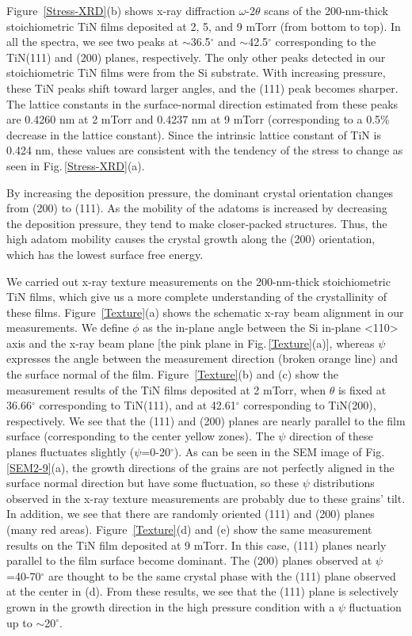 Figure \,\ref{Stress-XRD}(b) shows x-ray diffraction $\omega$-2$\theta$ scans of the 200-nm-thick stoichiometric TiN films deposited at 2, 5, and 9 mTorr (from bottom to top). In all the spectra, we see two peaks at $\sim$36.5$^{\circ}$ and $\sim$42.5$^{\circ}$ corresponding to the TiN(111) and (200) planes, respectively. The only other peaks detected in our stoichiometric TiN films were from the Si substrate.  With increasing pressure, these TiN peaks shift toward larger angles, and the (111) peak becomes sharper. The lattice constants in the surface-normal direction estimated from these peaks are 0.4260 nm at 2 mTorr and 0.4237 nm at 9 mTorr (corresponding to a 0.5\% decrease in the lattice constant). Since the intrinsic lattice constant of TiN is 0.424 nm, these values are consistent with the tendency of the stress to change as seen in Fig.\,\ref{Stress-XRD}(a).

By increasing the deposition pressure, the dominant crystal orientation changes from (200) to (111). As the mobility of the adatoms is increased by decreasing the deposition pressure, they tend to make closer-packed structures. Thus, the high adatom mobility causes the crystal growth along the (200) orientation, which has the lowest surface free energy.\cite{Patsalas2000}

We carried out x-ray texture measurements on the 200-nm-thick stoichiometric TiN films, which give us a more complete understanding of the crystallinity of these films. Figure \,\ref{Texture}(a) shows the schematic x-ray beam alignment in our measurements. We define $\phi$ as the in-plane angle between the Si in-plane <110> axis and the x-ray beam plane [the pink plane in Fig.\,\ref{Texture}(a)], whereas $\psi$ expresses the angle between the measurement direction (broken orange line) and the surface normal of the film. Figure \,\ref{Texture}(b) and (c) show the measurement results of the TiN films deposited at 2 mTorr, when $\theta$ is fixed at 36.66$^{\circ}$ corresponding to TiN(111), and at 42.61$^{\circ}$ corresponding to TiN(200), respectively. We see that the (111) and (200) planes are nearly parallel to the film surface (corresponding to the center yellow zones). The $\psi$ direction of these planes fluctuates slightly ($\psi$=0-20$^{\circ}$). As can be seen in the SEM image of Fig.\,\ref{SEM2-9}(a), the growth directions of the grains are not perfectly aligned in the surface normal direction but have some fluctuation, so these $\psi$ distributions observed in the x-ray texture measurements are probably due to these grains' tilt. In addition, we see that there are randomly oriented (111) and (200) planes (many red areas). Figure \,\ref{Texture}(d) and (e) show the same measurement results on the TiN film deposited at 9 mTorr. In this case, (111) planes nearly parallel to the film surface become dominant. The (200) planes observed at $\psi$=40-70$^{\circ}$ are thought to be the same crystal phase with the (111) plane observed at the center in (d). From these results, we see that the (111) plane is selectively grown in the growth direction in the high pressure condition with a $\psi$ fluctuation up to $\sim$20$^{\circ}$.

